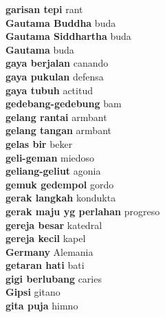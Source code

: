 \textbf{ garisan tepi  } rant \\
\textbf{ Gautama Buddha  } buda \\
\textbf{ Gautama Siddhartha  } buda \\
\textbf{ Gautama  } buda \\
\textbf{ gaya berjalan  } canando \\
\textbf{ gaya pukulan  } defensa \\
\textbf{ gaya tubuh  } actitud \\
\textbf{ gedebang-gedebung  } bam \\
\textbf{ gelang rantai  } armbant \\
\textbf{ gelang tangan  } armbant \\
\textbf{ gelas bir  } beker \\
\textbf{ geli-geman  } miedoso \\
\textbf{ geliang-geliut  } agonia \\
\textbf{ gemuk gedempol  } gordo \\
\textbf{ gerak langkah  } kondukta \\
\textbf{ gerak maju yg perlahan  } progreso \\
\textbf{ gereja besar  } katedral \\
\textbf{ gereja kecil  } kapel \\
\textbf{ Germany  } Alemania \\
\textbf{ getaran hati  } bati \\
\textbf{ gigi berlubang  } caries \\
\textbf{ Gipsi  } gitano \\
\textbf{ gita puja  } himno \\
